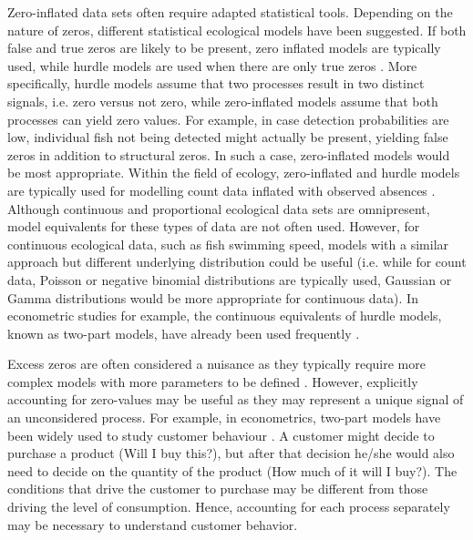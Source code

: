 \documentclass[preprint,12pt,authoryear]{elsarticle}
\begin{document}
Zero-inflated data sets often require adapted statistical tools. Depending on the nature of zeros, different statistical ecological models have been suggested. If both false and true zeros are likely to be present, zero inflated models are typically used, while hurdle models are used when there are only true zeros \citep{Zuur2009}. More specifically, hurdle models assume that two processes result in two distinct signals, i.e. zero versus not zero, while zero-inflated models assume that both processes can yield zero values. For example, in case detection probabilities are low, individual fish not being detected might actually be present, yielding false zeros in addition to structural zeros. In such a case, zero-inflated models would be most appropriate. Within the field of ecology, zero-inflated and hurdle models are typically used for modelling count data inflated with observed absences \citep{Blasco-Moreno2019WhatEcology,Joseph2009ModelingMechanisms,Zuur2009}. Although continuous and proportional ecological data sets are omnipresent, model equivalents for these types of data are not often used. However, for continuous ecological data, such as fish swimming speed, models with a similar approach but different underlying distribution could be useful (i.e. while for count data, Poisson or negative binomial distributions are typically used, Gaussian or Gamma distributions would be more appropriate for continuous data). In econometric studies for example, the continuous equivalents of hurdle models, known as two-part models, have already been used frequently \citep{Deb2002EstimatesModels,Farewell2017Two-PartData}. 

Excess zeros are often considered a nuisance as they typically require more complex models with more parameters to be defined \citep{Warton2005ManyData}. However, explicitly accounting for zero-values may be useful as they may represent a unique signal of an unconsidered process. For example, in econometrics, two-part models have been widely used to study customer behaviour \citep{Neelon2016ModelingOverview,Pohlmeier1995AnHealthcare}. A customer might decide to purchase a product (Will I buy this?), but after that decision he/she would also need to decide on the quantity of the product (How much of it will I buy?). The conditions that drive the customer to purchase may be different from those driving the level of consumption. Hence, accounting for each process separately may be necessary to understand customer behavior.
\end{document}

